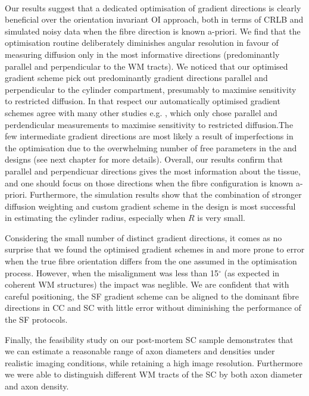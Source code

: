 \paragraph{}
Our results suggest that a dedicated optimisation of gradient directions is clearly beneficial over the orientation invariant \gls{OI}{} approach, both in terms of CRLB and simulated noisy data when the fibre direction is known a-priori. We find that the optimisation routine deliberately diminishes angular resolution in favour of measuring diffusion only in the most informative directions (predominantly parallel and perpendicular to the WM tracts). We noticed that our optimised gradient scheme pick out predominantly gradient directions parallel and perpendicular to the cylinder compartment, presumably to maximise sensitivity to restricted diffusion. In that respect our automatically optimised gradient schemes agree with many other studies e.g. \citep{Stanisz:1997,Avram:2008,Assaf:2008,Panagiotaki:2012}, which only chose parallel and perdendicular measurements to maximise sensitivity to restricted diffusion.The few intermediate gradient directions are most likely a result of imperfections in the optimisation due to the overwhelming number of free parameters in the \FD{} and \DO{} designs (see next chapter for more details). Overall, our results confirm that parallel and perpendicuar directions gives the most information about the tissue, and one should focus on those directions when the fibre configuration is known a-priori. Furthermore, the simulation results show that the combination of stronger diffusion weighting and custom gradient scheme in the \FD{} design is most successful in estimating the cylinder radius, especially when $R$ is very small.


Considering the small number of distinct gradient directions, it comes as no surprise that we found the optimised gradient schemes in {\FD} and {\DO} more prone to error when the true fibre orientation differs from the one assumed in the optimisation process. However, when the misalignment was less than 15$^\circ$ (as expected in coherent WM structures) the impact was neglible. We are confident that with careful positioning, the {\gls{SF}} gradient scheme can be aligned to the dominant fibre directions in CC and SC with little error without diminishing the performance of the {\gls{SF}} protocols.


Finally, the feasibility study on our post-mortem SC sample demonstrates that we can estimate a reasonable range of axon diameters and densities under realistic imaging conditions, while retaining a high image resolution. Furthermore we were able to distinguish different WM tracts of the SC by both axon diameter and axon density.

